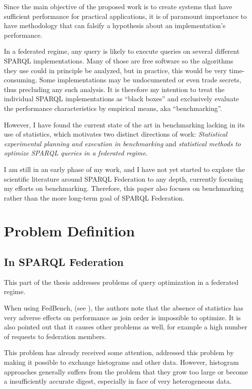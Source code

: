 \documentclass{llncs}
\begin{document}
Since the main objective of the proposed work is to create systems
that have sufficient performance for practical applications, it is of
paramount importance to have methodology that can falsify a
hypothesis about an implementation's performance.

In a federated regime, any query is likely to execute queries on
several different SPARQL implementations. Many of those are free
software so the algorithms they use could in principle be analyzed,
but in practice, this would be very time-consuming. Some
implementations may be undocumented or even trade secrets, thus
precluding any such analysis. It is therefore my intention to treat
the individual SPARQL implementations as ``black boxes'' and
exclusively evaluate the performance characteristics by empirical
means, aka ``benchmarking''.

However, I have found the current state of the art in benchmarking
lacking in its use of statistics, which motivates two distinct
directions of work: \emph{Statistical experimental planning and execution in
benchmarking} and \emph{statistical methods to optimize SPARQL queries
in a federated regime}.

I am still in an early phase of my work, and I have not yet started to
explore the scientific literature around SPARQL Federation to any
depth, currently focusing my efforts on benchmarking. Therefore, this
paper also focuses on benchmarking rather than the more long-term goal
of SPARQL Federation.

\section{Problem Definition}

\subsection{In SPARQL Federation}

This part of the thesis addresses problems of query optimization in a
federated regime.

When using FedBench, (see \cite{Schmidt:2011:FBS:2063016.2063054}),
the authors note that the absence of statistics has very adverse
effects on performance as join order is impossible to optimize. It is
also pointed out that it causes other problems as well, for example a
high number of requests to federation members. 

This problem has already received some attention, \cite{5337556}
addressed this problem by making it possible to exchange histograms
and other data. However, histogram approaches generally suffers from
the problem that they grow too large or become a insufficiently
accurate digest, especially in face of very heterogeneous data.
\end{document}
